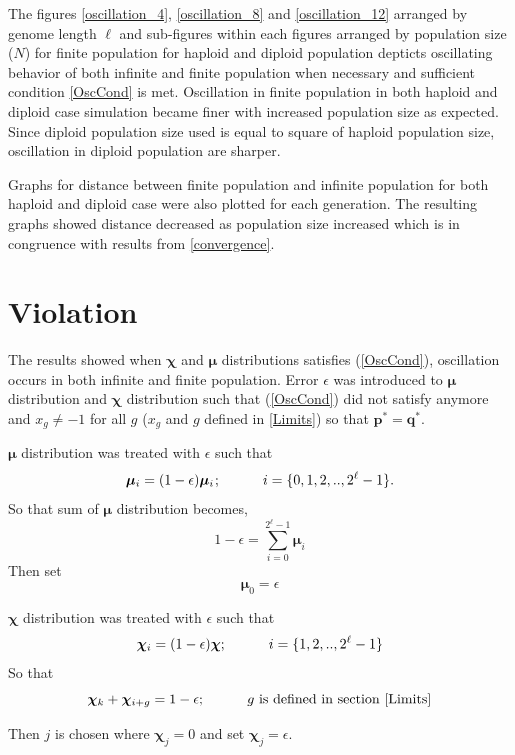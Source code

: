 The figures \ref{oscillation_4}, \ref{oscillation_8} and \ref{oscillation_12} arranged by genome length $\ell$ and 
sub-figures within each figures arranged by population size ($N$) for finite population for haploid and diploid population 
depticts oscillating behavior of both infinite and finite population when necessary and sufficient condition \ref{OscCond} is met. 
Oscillation in finite population in both haploid and diploid case simulation became finer with increased population size as expected. 
Since diploid population size used is equal to square of haploid population size, oscillation in diploid population are sharper.

Graphs for distance between finite population and infinite population for both haploid and diploid case were also plotted for each generation. 
The resulting graphs showed distance decreased as population size increased which is in congruence with results from \ref{convergence}.  

\section{Violation}
The results showed when $\bm{\chi}$ and $\bm{\mu}$ distributions satisfies (\ref{OscCond}), oscillation occurs in both infinite and finite population. 
Error $\epsilon$ was introduced to $\bm{\mu}$ distribution and $\bm{\chi}$ distribution such that (\ref{OscCond}) did not satisfy anymore and 
$x_g \neq −1$ for all $g$ ($x_g$ and $g$ defined in \ref{Limits}) so that $\bm{p}^\ast = \bm{q}^\ast$.

$\bm{\mu}$ distribution was treated with $\epsilon$ such that
\[
\bm{\mu}_i = (1-\epsilon) \bm{\mu}_i \hspace{0.01in}; \hspace{30pt} i = \{0, 1, 2,.., 2^{\ell}-1\}.
\]
So that sum of $\bm{\mu}$ distribution becomes, 
\[
1-\epsilon = \sum \limits_{i=0}^{2^{\ell}-1} \bm{\mu}_i
\]
Then set
\[
\bm{\mu}_0 = \epsilon
\]

$\bm{\chi}$ distribution was treated with $\epsilon$ such that
\[
\bm{\chi}_i = (1-\epsilon) \bm{\chi} ; \hspace{30pt} i = \{1, 2,.., 2^{\ell}-1\} 
\]
So that 
\[
\bm{\chi}_k + \bm{\chi}_{i+g} = 1-\epsilon ; \hspace{30pt} g \text{ is defined in  section } \ref{Limits}
\]

Then $j$ is chosen where $\bm{\chi}_j = 0$ and set $\bm{\chi}_j = \epsilon$. \newline

